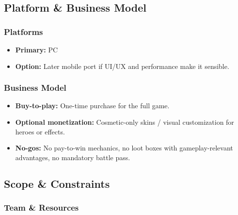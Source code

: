 
\subsection{Platform \& Business Model}

\subsubsection*{Platforms}

\begin{itemize}
	\item \textbf{Primary:} PC
	\item \textbf{Option:} Later mobile port if UI/UX and performance make it sensible.
\end{itemize}


\subsubsection*{Business Model}

\begin{itemize}
	\item \textbf{Buy-to-play:} One-time purchase for the full game.
	\item \textbf{Optional monetization:} Cosmetic-only skins / visual customization for heroes or effects.
	\item \textbf{No-gos:} No pay-to-win mechanics, no loot boxes with gameplay-relevant advantages, no mandatory battle pass.
\end{itemize}

\subsection{Scope \& Constraints}

\subsubsection*{Team \& Resources}


